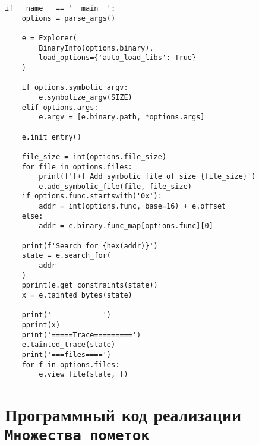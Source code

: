 \begin{lstlisting}[environoment=py_code, caption=taint\_influence.py, captionpos=b]
if __name__ == '__main__':
    options = parse_args()

    e = Explorer(
        BinaryInfo(options.binary),
        load_options={'auto_load_libs': True}
    )

    if options.symbolic_argv:
        e.symbolize_argv(SIZE)
    elif options.args:
        e.argv = [e.binary.path, *options.args]

    e.init_entry()

    file_size = int(options.file_size)
    for file in options.files:
        print(f'[+] Add symbolic file of size {file_size}')
        e.add_symbolic_file(file, file_size)
    if options.func.startswith('0x'):
        addr = int(options.func, base=16) + e.offset
    else:
        addr = e.binary.func_map[options.func][0]

    print(f'Search for {hex(addr)}')
    state = e.search_for(
        addr
    )
    pprint(e.get_constraints(state))
    x = e.tainted_bytes(state)

    print('------------')
    pprint(x)
    print('=====Trace=========')
    e.tainted_trace(state)
    print('===files====')
    for f in options.files:
        e.view_file(state, f)

\end{lstlisting}


\chapter{Программный код реализации \texttt{Множества пометок}}
\label{tagsetimpl}

